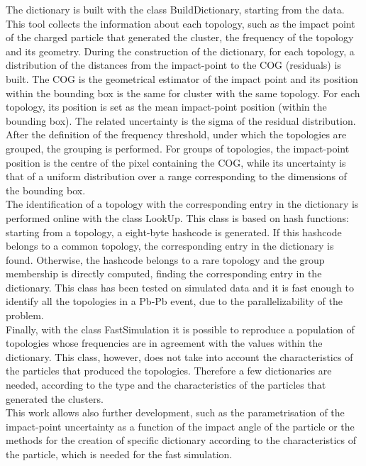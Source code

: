 The dictionary is built with the class BuildDictionary, starting from the data. This tool collects the information about each topology, such as the impact point of the charged particle that generated the cluster, the frequency of the topology and its geometry. During the construction of the dictionary, for each topology, a distribution of the distances from the impact-point to the COG (residuals) is built. The COG is the geometrical estimator of the impact point and its position within the bounding box is the same for cluster with the same topology. For each topology, its position is set as the mean impact-point position (within the bounding box). The related uncertainty is the sigma of the residual distribution. After the definition of the frequency threshold, under which the topologies are grouped, the grouping is performed. For groups of topologies, the impact-point position is the centre of the pixel containing the COG, while its uncertainty is that of a uniform distribution over a range corresponding to the dimensions of the bounding box.\\
The identification of a topology with the corresponding entry in the dictionary is performed online with the class LookUp. This class is based on hash functions: starting from a topology, a eight-byte hashcode is generated. If this hashcode belongs to a common topology, the corresponding entry in the dictionary is found. Otherwise, the hashcode belongs to a rare topology and the group membership is directly computed, finding the corresponding entry in the dictionary. This class has been tested on simulated data and it is fast enough to identify all the topologies in a Pb-Pb event, due to the parallelizability of the problem.\\
Finally, with the class FastSimulation it is possible to reproduce a population of topologies whose frequencies are in agreement with the values within the dictionary. This class, however, does not take into account the characteristics of the particles that produced the topologies. Therefore a few dictionaries are needed, according to the type and the characteristics of the particles that generated the clusters.\\
This work allows also further development, such as the parametrisation of the impact-point uncertainty as a function of the impact angle of the particle or the methods for the creation of specific dictionary according to the characteristics of the particle, which is needed for the fast simulation. 